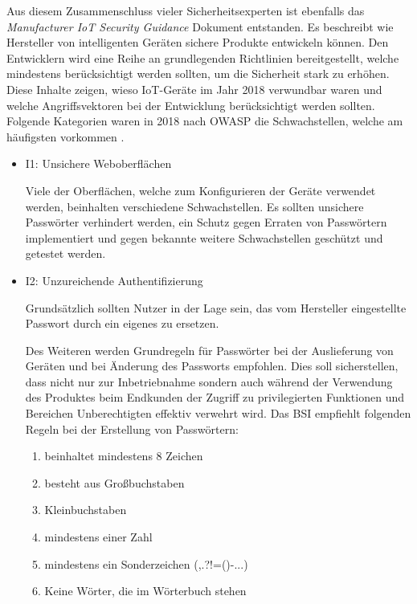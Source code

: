         Aus diesem Zusammenschluss vieler Sicherheitsexperten ist ebenfalls das \emph{Manufacturer \ac{IoT} Security Guidance} Dokument \cite{stahl_2017} entstanden. Es beschreibt wie Hersteller von intelligenten Geräten sichere Produkte entwickeln können. Den Entwicklern wird eine Reihe an grundlegenden Richtlinien bereitgestellt, welche mindestens berücksichtigt werden sollten, um die Sicherheit stark zu erhöhen.
        Diese Inhalte zeigen, wieso \ac{IoT}-Geräte im Jahr 2018 verwundbar waren und welche Angriffsvektoren bei der Entwicklung berücksichtigt werden sollten. 
        Folgende Kategorien waren in 2018 nach \ac{OWASP} die Schwachstellen, welche am häufigsten vorkommen \cite{stahl_2017}. 
        \begin{itemize}
            \item I1: Unsichere Weboberflächen
            
            Viele der Oberflächen, welche zum Konfigurieren der Geräte verwendet werden, beinhalten verschiedene Schwachstellen.
            Es sollten unsichere Passwörter verhindert werden, ein Schutz gegen Erraten von Passwörtern implementiert und gegen bekannte weitere Schwachstellen geschützt und getestet werden.
            
            \item I2: Unzureichende Authentifizierung
            
            Grundsätzlich sollten Nutzer in der Lage sein, das vom Hersteller eingestellte Passwort durch ein eigenes zu ersetzen.
            
            Des Weiteren werden Grundregeln für Passwörter bei der Auslieferung von Geräten und bei Änderung des Passworts empfohlen. Dies soll sicherstellen, dass nicht nur zur Inbetriebnahme sondern auch während der Verwendung des Produktes beim Endkunden der Zugriff zu privilegierten Funktionen und Bereichen Unberechtigten effektiv verwehrt wird. Das \ac{BSI} \cite{bundesamt_fuer_sicherheit_in_der_informationstechnik_2018} 
            empfiehlt folgenden Regeln bei der Erstellung von Passwörtern:
            \begin{enumerate}
                \item beinhaltet mindestens 8 Zeichen
                \item besteht aus Großbuchstaben
                \item Kleinbuchstaben
                \item mindestens einer Zahl
                \item mindestens ein Sonderzeichen (,.?!=()-...)
                \item Keine Wörter, die im Wörterbuch stehen
            \end{enumerate}
            

\end{itemize}
